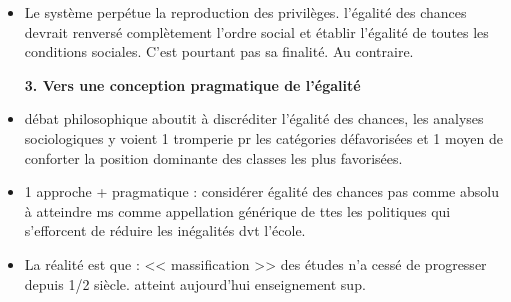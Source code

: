 \documentclass[12pt]{report}
\begin{document}
\begin{itemize}
\item Le système perpétue la reproduction des privilèges. l'égalité des chances devrait renversé complètement l'ordre social et établir l'égalité de toutes les conditions sociales. C'est pourtant pas sa finalité. Au contraire.


\textbf{3. Vers une conception pragmatique de l'égalité}\\

\item débat philosophique aboutit à discréditer l'égalité des chances, les analyses sociologiques y voient 1 tromperie pr les catégories défavorisées et 1 moyen de conforter la position dominante des classes les plus favorisées. \\

\item 1 approche + pragmatique : considérer égalité des chances pas comme absolu à atteindre ms comme appellation générique de ttes les politiques qui s'efforcent de réduire les inégalités dvt l'école.\\

\item La réalité est que : << massification >> des études n'a cessé de progresser depuis 1/2 siècle. atteint aujourd'hui enseignement sup.


\vspace{0.5cm}


\end{itemize}
\end{document}
